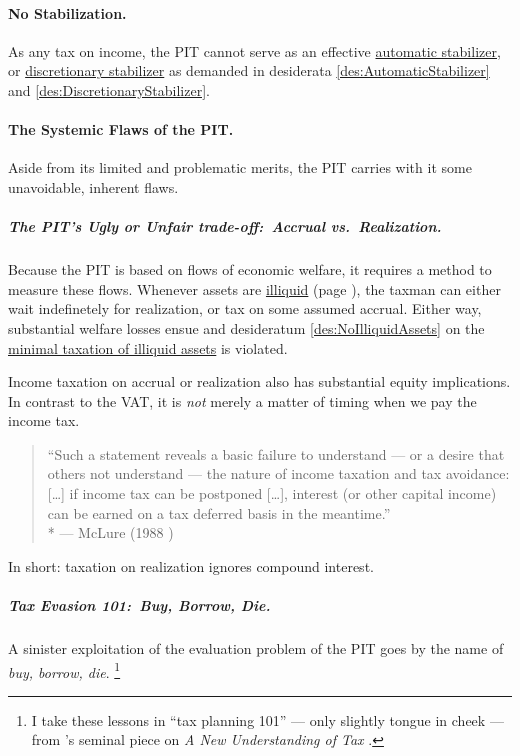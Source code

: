 \paragraph{No Stabilization.}
As any tax on income, the PIT cannot serve as an effective \hyperref[des:AutomaticStabilizer]{automatic stabilizer}, or \hyperref[des:DiscretionaryStabilizer]{discretionary stabilizer} as demanded in desiderata \ref{des:AutomaticStabilizer} and \ref{des:DiscretionaryStabilizer}.

\paragraph{The Systemic Flaws of the PIT.}
Aside from its limited and problematic merits, the PIT carries with it some unavoidable, inherent flaws.

\subparagraph{The PIT's Ugly or Unfair trade-off:~Accrual vs.~Realization.}
Because the PIT is based on flows of economic welfare, it requires a method to measure these flows.
Whenever assets are \hyperref[sec:Illiquid]{illiquid} (page \pageref{sec:Illiquid}), the taxman can either wait indefinetely for realization, or tax on some assumed accrual.
Either way, substantial welfare losses ensue and desideratum \ref{des:NoIlliquidAssets} on the \hyperref[des:NoIlliquidAssets]{minimal taxation of illiquid assets} is violated.

Income taxation on accrual or realization also has substantial equity implications.
In contrast to the VAT, it is \emph{not} merely a matter of timing when we pay the income tax.

\begin{quote}
	``Such a statement reveals a basic failure to understand --- or a desire that others not understand --- the nature of income taxation and tax avoidance:
	[\ldots] if income tax can be postponed [\ldots], interest (or other capital income) can be earned on a tax deferred basis in the meantime.''
	\\*
	--- McLure (1988 \citealt[as cited in][125]{Seidman1997})
\end{quote}

In short:
taxation on realization ignores compound interest.

\subparagraph{Tax Evasion 101:~Buy, Borrow, Die.}
	\label{sec:TaxEvasion101}
A sinister exploitation of the evaluation problem of the PIT goes by the name of \emph{buy, borrow, die}.
\footnote{
	I take these lessons in ``tax planning 101'' --- only slightly tongue in cheek --- from \citeauthor{McCaffery2005}'s seminal piece on \emph{A New Understanding of Tax} \citeyearpar[888ff]{McCaffery2005}.
}

